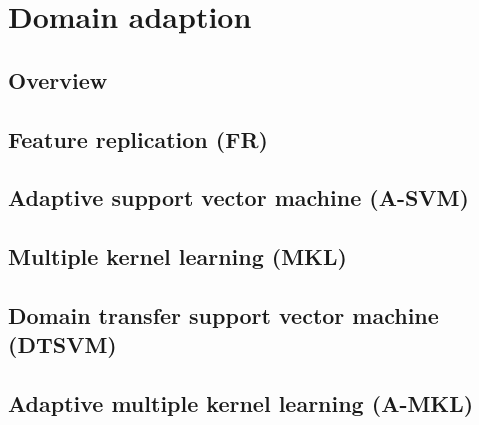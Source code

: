 \section{Domain adaption}
\subsection{Overview}
\subsection{Feature replication (FR)}
\subsection{Adaptive support vector machine (A-SVM)}
\subsection{Multiple kernel learning (MKL)}
\subsection{Domain transfer support vector machine (DTSVM)}
\subsection{Adaptive multiple kernel learning (A-MKL)}